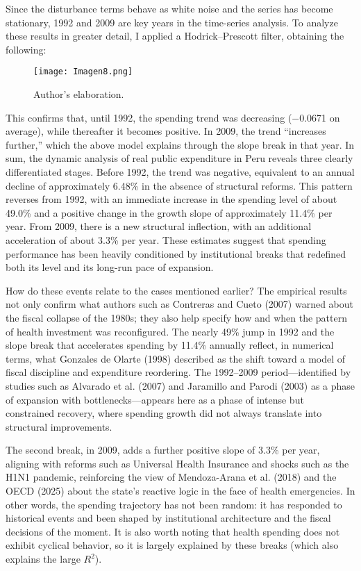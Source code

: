 \documentclass[12pt]{article}
\begin{document}
Since the disturbance terms behave as white noise and the series has become stationary, 1992 and 2009 are key years in the time-series analysis. To analyze these results in greater detail, I applied a Hodrick–Prescott filter, obtaining the following:

\begin{figure}[H]
\par\vspace{0.8em}
\texttt{[image: Imagen8.png]}

{\footnotesize Author’s elaboration.}
\end{figure}

This confirms that, until 1992, the spending trend was decreasing (−0.0671 on average), while thereafter it becomes positive. In 2009, the trend “increases further,” which the above model explains through the slope break in that year. In sum, the dynamic analysis of real public expenditure in Peru reveals three clearly differentiated stages. Before 1992, the trend was negative, equivalent to an annual decline of approximately 6.48\% in the absence of structural reforms. This pattern reverses from 1992, with an immediate increase in the spending level of about 49.0\% and a positive change in the growth slope of approximately 11.4\% per year. From 2009, there is a new structural inflection, with an additional acceleration of about 3.3\% per year. These estimates suggest that spending performance has been heavily conditioned by institutional breaks that redefined both its level and its long-run pace of expansion.

How do these events relate to the cases mentioned earlier? The empirical results not only confirm what authors such as Contreras and Cueto (2007) warned about the fiscal collapse of the 1980s; they also help specify how and when the pattern of health investment was reconfigured. The nearly 49\% jump in 1992 and the slope break that accelerates spending by 11.4\% annually reflect, in numerical terms, what Gonzales de Olarte (1998) described as the shift toward a model of fiscal discipline and expenditure reordering. The 1992–2009 period—identified by studies such as Alvarado et al. (2007) and Jaramillo and Parodi (2003) as a phase of expansion with bottlenecks—appears here as a phase of intense but constrained recovery, where spending growth did not always translate into structural improvements.

The second break, in 2009, adds a further positive slope of 3.3\% per year, aligning with reforms such as Universal Health Insurance and shocks such as the H1N1 pandemic, reinforcing the view of Mendoza-Arana et al. (2018) and the OECD (2025) about the state’s reactive logic in the face of health emergencies. In other words, the spending trajectory has not been random: it has responded to historical events and been shaped by institutional architecture and the fiscal decisions of the moment. It is also worth noting that health spending does not exhibit cyclical behavior, so it is largely explained by these breaks (which also explains the large $R^2$).
\end{document}
